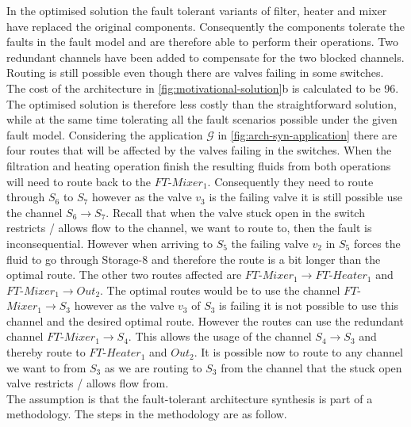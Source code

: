 In the optimised solution the fault tolerant variants of filter, heater and mixer have replaced the original components. Consequently the components tolerate the faults in the fault model and are therefore able to perform their operations. Two redundant channels have been added to compensate for the two blocked channels. Routing is still possible even though there are valves failing in some switches. The cost of the architecture in \autoref{fig:motivational-solution}b is calculated to be 96. The optimised solution is therefore less costly than the straightforward solution, while at the same time tolerating all the fault scenarios possible under the given fault model. Considering the application $\mathcal{G}$ in \autoref{fig:arch-syn-application} there are four routes that will be affected by the valves failing in the switches. When the filtration and heating operation finish the resulting fluids from both operations will need to route back to the $FT$-$Mixer_1$. Consequently they need to route through $S_6$ to $S_7$ however as the valve $v_3$ is the failing valve it is still possible use the channel $S_6 \rightarrow S_7$. Recall that when the valve stuck open in the switch restricts / allows flow to the channel, we want to route to, then the fault is inconsequential. However when arriving to $S_5$ the failing valve $v_2$ in $S_5$ forces the fluid to go through Storage-8 and therefore the route is a bit longer than the optimal route. The other two routes affected are $FT$-$Mixer_1 \rightarrow FT$-$Heater_1$ and $FT$-$Mixer_1 \rightarrow Out_2$. The optimal routes would be to use the channel $FT$-$Mixer_1 \rightarrow S_3$ however as the valve $v_3$ of $S_3$ is failing it is not possible to use this channel and the desired optimal route. However the routes can use the redundant channel $FT$-$Mixer_1 \rightarrow S_4$. This allows the usage of the channel $S_4 \rightarrow S_3$ and thereby route to $FT$-$Heater_1$ and $Out_2$. It is possible now to route to any channel we want to from $S_3$ as we are routing to $S_3$ from the channel that the stuck open valve restricts / allows flow from.\\

The assumption is that the fault-tolerant architecture synthesis is part of a methodology. The steps in the methodology are as follow.


